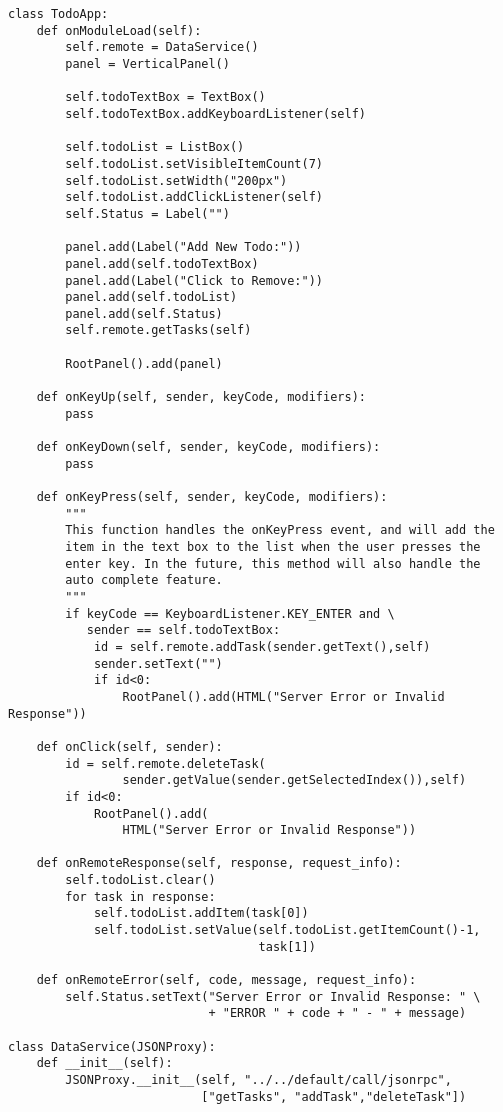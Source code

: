 \documentclass[justified,sixbynine,notoc]{tufte-book}
\begin{document}
\begin{fullwidth}
\begin{lstlisting}
class TodoApp:
    def onModuleLoad(self):
        self.remote = DataService()
        panel = VerticalPanel()

        self.todoTextBox = TextBox()
        self.todoTextBox.addKeyboardListener(self)

        self.todoList = ListBox()
        self.todoList.setVisibleItemCount(7)
        self.todoList.setWidth("200px")
        self.todoList.addClickListener(self)
        self.Status = Label("")

        panel.add(Label("Add New Todo:"))
        panel.add(self.todoTextBox)
        panel.add(Label("Click to Remove:"))
        panel.add(self.todoList)
        panel.add(self.Status)
        self.remote.getTasks(self)

        RootPanel().add(panel)

    def onKeyUp(self, sender, keyCode, modifiers):
        pass

    def onKeyDown(self, sender, keyCode, modifiers):
        pass

    def onKeyPress(self, sender, keyCode, modifiers):
        """
        This function handles the onKeyPress event, and will add the
        item in the text box to the list when the user presses the
        enter key. In the future, this method will also handle the
        auto complete feature.
        """
        if keyCode == KeyboardListener.KEY_ENTER and \
           sender == self.todoTextBox:
            id = self.remote.addTask(sender.getText(),self)
            sender.setText("")
            if id<0:
                RootPanel().add(HTML("Server Error or Invalid Response"))

    def onClick(self, sender):
        id = self.remote.deleteTask(
                sender.getValue(sender.getSelectedIndex()),self)
        if id<0:
            RootPanel().add(
                HTML("Server Error or Invalid Response"))

    def onRemoteResponse(self, response, request_info):
        self.todoList.clear()
        for task in response:
            self.todoList.addItem(task[0])
            self.todoList.setValue(self.todoList.getItemCount()-1,
                                   task[1])

    def onRemoteError(self, code, message, request_info):
        self.Status.setText("Server Error or Invalid Response: " \
                            + "ERROR " + code + " - " + message)

class DataService(JSONProxy):
    def __init__(self):
        JSONProxy.__init__(self, "../../default/call/jsonrpc",
                           ["getTasks", "addTask","deleteTask"])


\end{lstlisting}
\end{fullwidth}
\end{document}
